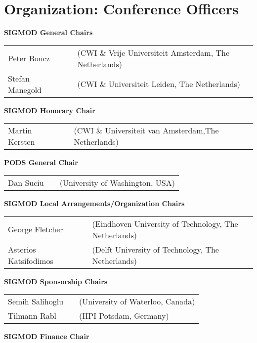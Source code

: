
\clearpage
\ifodd\value{page}\hbox{}\newpage\fi
\section{Organization: Conference Officers}

{
\setlength{\tabcolsep}{0pt}

\textbf{SIGMOD General Chairs}

\begin{tabular}{lp{.5em}l}
Peter Boncz	&& \textsf{\small(CWI \& Vrije Universiteit Amsterdam, The Netherlands)}	\\
Stefan Manegold	&& \textsf{\small(CWI \& Universiteit Leiden, The Netherlands)}	\\
\end{tabular}

\vfill
\textbf{SIGMOD Honorary Chair}

\begin{tabular}{lp{.5em}l}
Martin Kersten	&& \textsf{\small(CWI \& Universiteit van Amsterdam,The Netherlands)}
\end{tabular}

\vfill
\textbf{PODS General Chair}

\begin{tabular}{lp{.5em}l}
Dan Suciu	&& \textsf{\small(University of Washington, USA)}
\end{tabular}

\vfill
\textbf{SIGMOD Local Arrangements/Organization Chairs}

\begin{tabular}{lp{.5em}l}
George Fletcher	&& \textsf{\small(Eindhoven University of Technology, The Netherlands)}	\\
Asterios Katsifodimos	&& \textsf{\small(Delft University of Technology, The Netherlands)}
\end{tabular}

\vfill
\textbf{SIGMOD Sponsorship Chairs}

\begin{tabular}{lp{.5em}l}
Semih Salihoglu	&& \textsf{\small(University of Waterloo, Canada)}	\\
Tilmann Rabl	&& \textsf{\small(HPI Potsdam, Germany)}
\end{tabular}

\vfill
\textbf{SIGMOD Finance Chair}

}
